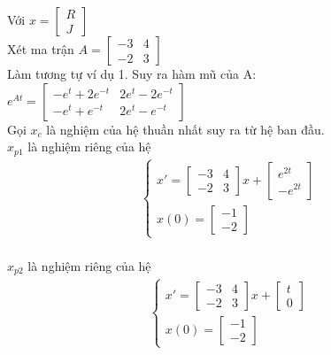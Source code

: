 \hspace{0.3cm}Với $x=
\begin{bmatrix}
    R\\
    J
\end{bmatrix}$\\
Xét ma trận $A=
\begin{bmatrix}
    -3&4\\
    -2&3
\end{bmatrix}
$\\
Làm tương tự ví dụ 1. Suy ra hàm mũ của A:\\
\hspace*{4cm}$e^{At}=
\begin{bmatrix}
    -e^t+2e^{-t} & 2e^t-2e^{-t}\\
    -e^t+e^{-t} & 2e^t-e^{-t}
\end{bmatrix}
$\\
Gọi $x_c$ là nghiệm của hệ thuần nhất suy ra từ hệ ban đầu.\\
\hspace*{0.6cm}$x_{p1}$ là nghiệm riêng của hệ 
\begin{align*}
    \begin{cases}
        x'=
        \begin{bmatrix}
        -3 & 4\\
        -2 & 3
        \end{bmatrix}
        x+
        \begin{bmatrix}
        e^{2t}\\
        -e^{2t}
        \end{bmatrix}
        \\
        x(0)=\begin{bmatrix}
        -1\\
        -2
        \end{bmatrix}
    \end{cases}
\end{align*}
\\
\hspace*{0.6cm}$x_{p2}$ là nghiệm riêng của hệ
\begin{align*}
    \begin{cases}
        x'=
        \begin{bmatrix}
        -3 & 4\\
        -2 & 3
        \end{bmatrix}
        x
        +\begin{bmatrix}
        t\\
        0
        \end{bmatrix}
        \\
        x(0)=\begin{bmatrix}
        -1\\
        -2
        \end{bmatrix}
    \end{cases}
\end{align*}
